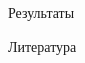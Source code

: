 \documentclass{beamer}
\begin{document}
\begin{frame}[t]
\begin{columns}[t]
\begin{column}[t]{0.47\paperwidth}
\begin{block}{Результаты}
\end{block}
          \begin{block}{Литература}
            
            \printbibliography

            
          \end{block}
        \end{column}
    \end{columns}
\end{frame}
\end{document}
